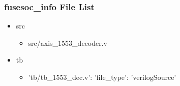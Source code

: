 \subsubsection{fusesoc\_info File List}
\begin{itemize}
\item src
	\begin{itemize}
	\item src/axis\_1553\_decoder.v
	\end{itemize}
\item tb
	\begin{itemize}
	\item {'tb/tb\_1553\_dec.v': {'file\_type': 'verilogSource'}}
	\end{itemize}
\end{itemize}

